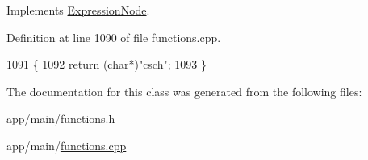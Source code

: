 Implements \hyperlink{classExpressionNode_a42a5e9562b0f645a19dcc83f698069b5}{Expression\+Node}.



Definition at line 1090 of file functions.\+cpp.


\begin{DoxyCode}
1091 \{
1092     \textcolor{keywordflow}{return} (\textcolor{keywordtype}{char}*)\textcolor{stringliteral}{"csch"};
1093 \}
\end{DoxyCode}


The documentation for this class was generated from the following files\+:\begin{DoxyCompactItemize}
\item 
app/main/\hyperlink{functions_8h}{functions.\+h}\item 
app/main/\hyperlink{functions_8cpp}{functions.\+cpp}\end{DoxyCompactItemize}

